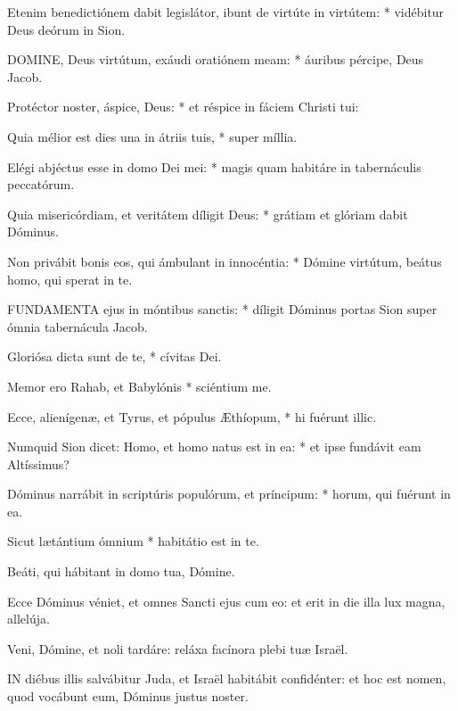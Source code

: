 Etenim benedictiónem dabit legislátor, ibunt de virtúte in virtútem: * vidébitur Deus deórum in Sion.


\lettrine[lines=2]{D}{OMINE}, Deus virtútum, exáudi oratiónem meam: * áuribus pércipe, Deus Jacob.

Protéctor noster, áspice, Deus: * et réspice in fáciem Christi tui:

Quia mélior est dies una in átriis tuis, * super míllia.

Elégi abjéctus esse in domo Dei mei: * magis quam habitáre in tabernáculis peccatórum.

Quia misericórdiam, et veritátem díligit Deus: * grátiam et glóriam dabit Dóminus.

Non privábit bonis eos, qui ámbulant in innocéntia: * Dómine virtútum, beátus homo, qui sperat in te.


\lettrine[lines=2]{F}{UNDAMENTA} ejus in móntibus sanctis: * díligit Dóminus portas Sion super ómnia tabernácula Jacob.

Gloriósa dicta sunt de te, * cívitas Dei.

Memor ero Rahab, et Babylónis * sciéntium me.

Ecce, alienígenæ, et Tyrus, et pópulus Æthíopum, * hi fuérunt illic.

Numquid Sion dicet: Homo, et homo natus est in ea: * et ipse fundávit eam Altíssimus?

Dóminus narrábit in scriptúris populórum, et príncipum: * horum, qui fuérunt in ea.

Sicut lætántium ómnium * habitátio est in te.

  Beáti, qui hábitant in domo tua, Dómine.


  Ecce Dóminus véniet, et omnes Sancti ejus cum eo: et erit in die illa lux magna, allelúja.

  Veni, Dómine, et noli tardáre: reláxa facínora plebi tuæ Israël.


\lettrine[lines=2]{I}{N} diébus illis salvábitur Juda, et Israël habitábit confidénter: et hoc est nomen, quod vocábunt eum, Dóminus justus noster.

